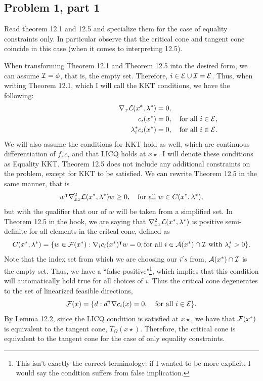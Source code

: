 \subsection{Problem 1, part 1}
Read theorem 12.1 and 12.5 and specialize them for the case of equality constraints only. In particular observe that the critical cone and tangent cone coincide in this case (when it comes to interpreting 12.5).
\partbreak
\begin{solution}

    When transforming Theorem 12.1 and Theorem 12.5 into the desired form, we can assume $\mathcal{I} = \phi$, that is, the empty set. Therefore, $i \in \mathcal{E} \cup \mathcal{I} = \mathcal{E}$. Thus, when writing Theorem 12.1, which I will call the KKT conditions, we have the following:
    \begin{align*}
        \hspace{40mm}\grad_x \scL (x\star, \lm\star) &= 0,\\
        c_i(x\star) &= 0, \quad \text{for all } i \in \scE,\\
        \lm_i\star c_i(x\star) &= 0, \quad \text{for all } i \in \scE.& 
    \end{align*}
    We will also assume the conditions for KKT hold as well, which are continuous differentiation of $f, c_i$ and that LICQ holds at $x\star$. I will denote these conditions as Equality KKT. Theorem 12.5 does not include any additional constraints on the problem, except for KKT to be satisfied. We can rewrite Theorem 12.5 in the same manner, that is 
    \[w^\intercal \nabla^2_{xx}\mathcal{L}(x^*, \mathrm{\lambda}^*) w \geq 0, \quad \text{for all } w \in C(x^*, \mathrm{\lambda}^*),\]
    but with the qualifier that our of $w$ will be taken from a simplified set. In Theorem 12.5 in the book, we are saying that $\nabla_{xx}^2\mathcal{L} (x^*, \mathrm{\lambda}^*)$ is positive semi-definite for all elements in the critcal cone, defined as 
    \[C(x^*, \mathrm{\lambda}^*) = \{ w \in \mathcal{F}(x^*) : \nabla_ic_i(x^*)^\intercal w = 0, \text{for all } i \in \mathcal{A}(x^*) \cap \mathcal{I} \text{ with } \mathrm{\lambda}_i^* > 0\}.\]
    Note that the index set from which we are choosing our $i's$ from, $\mathcal{A}(x^*) \cap \mathcal{I}$ is the empty set. Thus, we have a ``false positive"\footnote{This isn't exactly the correct terminology: if I wanted to be more explicit, I would say the condition suffers from false implication.}, which implies that this condition will automatically hold true for all choices of $i$. Thus the critical cone degenerates to the set of linearized feasible directions, 
    \[\mathcal{F}(x) = \{d : d^\intercal \nabla c_i(x) = 0, \quad \text{for all } i \in \mathcal{E} \}.\]
    By Lemma 12.2, since the LICQ condition is satisfied at $x\star$, we have that $\mathcal{F}(x^*)$ is equivalent to the tangent cone, $T_\Omega(x\star)$.  Therefore, the critical cone is equivalent to the tangent cone for the case of only equality constraints.
\end{solution}

